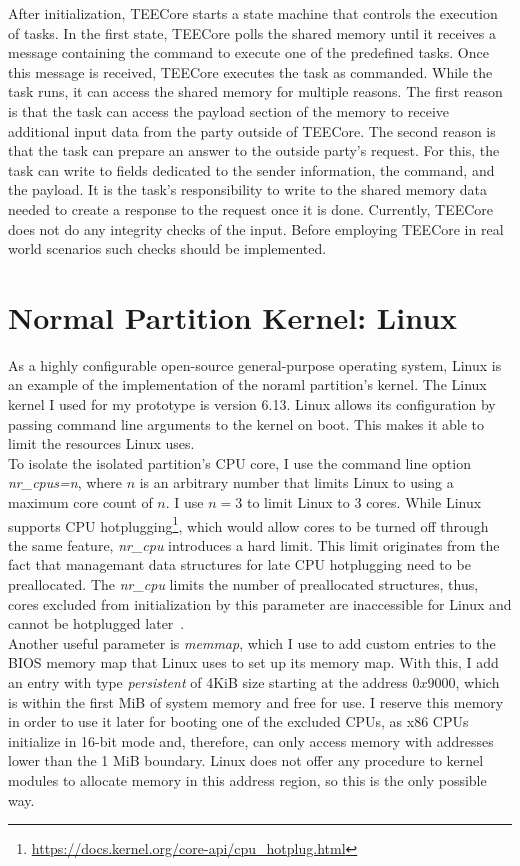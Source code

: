 After initialization, TEECore starts a state machine that
controls the execution of tasks. In the first state, TEECore polls the
shared memory until it receives a message containing the command to execute one
of the predefined tasks. Once this message is received, TEECore executes
the task as commanded. While the task runs, it can access the shared memory for
multiple reasons. The first reason is that the task can access the payload
section of the memory to receive additional input data from the party outside of
TEECore. The second reason is that the task can prepare an answer to the
outside party's request. For this, the task can write to fields dedicated to the
sender information, the command, and the payload. It is the task's
responsibility to write to the shared memory data needed to create a response to
the request once it is done. Currently, TEECore does not do any integrity checks
of the input. Before employing TEECore in real world scenarios such checks
should be implemented.

\section{Normal Partition Kernel: Linux}
\label{sec:implementation:hostKernel}
As a highly configurable open-source general-purpose operating system, Linux is
an example of the implementation of the noraml partition's kernel. The Linux
kernel I used for my prototype is version 6.13. Linux allows its configuration
by passing command line arguments to the kernel on boot. This makes it able to
limit the resources Linux uses. \\

To isolate the isolated partition's CPU core, I use the command line option
\textit{nr\_cpus=n}, where $n$ is an arbitrary number that limits Linux to using
a maximum core count of $n$. I use $n=3$ to limit Linux to 3 cores. While Linux
supports CPU
hotplugging\footnote{\url{https://docs.kernel.org/core-api/cpu_hotplug.html}},
which would allow cores to be turned off through the same feature,
\textit{nr\_cpu} introduces a hard limit. This limit originates from the fact
that managemant data structures for late CPU hotplugging need to be
preallocated. The \textit{nr\_cpu} limits the number of preallocated structures,
thus, cores excluded from initialization by this parameter are inaccessible for
Linux and cannot be hotplugged later~\cite{kernel-parameters}. \\

Another useful parameter is \textit{memmap}, which I use to add custom entries
to the BIOS memory map that Linux uses to set up its memory map. With this, I
add an entry with type \textit{persistent} of 4KiB size starting at the address
$0x9000$, which is within the first MiB of system memory and free for use. I
reserve this memory in order to use it later for booting one of the excluded
CPUs, as x86 CPUs initialize in 16-bit mode and, therefore, can only access
memory with addresses lower than the 1 MiB boundary. Linux does not offer any
procedure to kernel modules to allocate memory in this address region, so this
is the only possible way.\\

